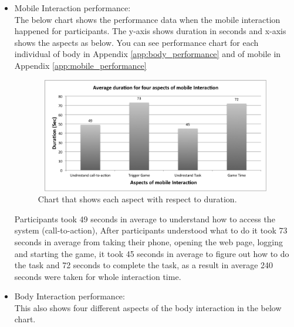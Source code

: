 \begin{itemize}

\item Mobile Interaction performance: \\
The below chart shows the performance data when the mobile interaction happened for participants. The y-axis shows duration in seconds and x-axis shows the aspects as below. You can see performance chart for each individual of body in Appendix \ref{app:body_performance} and of mobile in Appendix \ref{app:mobile_performance}

\begin{figure}[H]
\centering
\includegraphics[width=12cm,height=5cm]{Figures/6/mobile_average}%
 \caption{Chart that shows each aspect with respect to duration. }%
 \label{fig:mobile_average}%
\end{figure}

 Participants took 49 seconds in average to understand how to access the system (call-to-action), After participants understood what to do it took 73 seconds in average from taking their phone, opening the web page, logging and starting the game, it took 45 seconds in average to figure out how to do the task and 72 seconds to complete the task, as a result in average 240 seconds were taken for whole interaction time.

%


\item Body Interaction performance: \\
This also shows four different aspects of the body interaction in the below chart.


\end{itemize}

